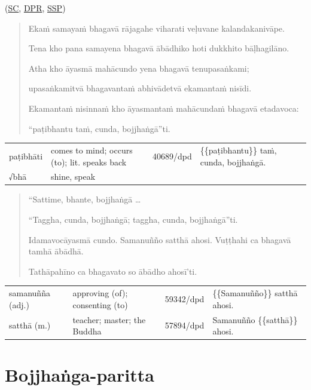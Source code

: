 \documentclass[11pt,oneside]{memoir}
\begin{document}
(\href{https://suttacentral.net/sn46.16/pli/ms}{SC}, \href{https://www.digitalpalireader.online/\_dprhtml/index.html?loc=s.4.0.0.1.1.5.m}{DPR}, \href{http://localhost:4848/suttas/sn46.16/pli/ms?window\_type=Sutta+Study}{SSP})

\begin{quote}
Ekaṁ samayaṁ bhagavā rājagahe viharati veḷuvane kalandakanivāpe.

Tena kho pana samayena bhagavā ābādhiko hoti dukkhito bāḷhagilāno.

Atha kho āyasmā mahācundo yena bhagavā tenupasaṅkami;

upasaṅkamitvā bhagavantaṁ abhivādetvā ekamantaṁ nisīdi.

Ekamantaṁ nisinnaṁ kho āyasmantaṁ mahācundaṁ bhagavā etadavoca:

“paṭibhantu taṁ, cunda, bojjhaṅgā”ti.
\end{quote}

\begin{longtable}{L{\colOne} L{\colTwo} H H}
paṭibhāti & comes to mind; occurs (to); lit. speaks back & 40689/dpd & \{\{paṭibhantu\}\} taṁ, cunda, bojjhaṅgā.\\[0pt]
√bhā & shine, speak &  & \\[0pt]
\end{longtable}

\begin{quote}
“Sattime, bhante, bojjhaṅgā \ldots{}

“Taggha, cunda, bojjhaṅgā; taggha, cunda, bojjhaṅgā”ti.

Idamavocāyasmā cundo. Samanuñño satthā ahosi. Vuṭṭhahi ca bhagavā tamhā ābādhā.

Tathāpahīno ca bhagavato so ābādho ahosī'ti.
\end{quote}

\begin{longtable}{L{\colOne} L{\colTwo} H H}
samanuñña (adj.) & approving (of); consenting (to) & 59342/dpd & \{\{Samanuñño\}\} satthā ahosi.\\[0pt]
satthā (m.) & teacher; master; the Buddha & 57894/dpd & Samanuñño \{\{satthā\}\} ahosi.\\[0pt]
\end{longtable}

\clearpage
\casesLegendHeaderBGHere

\section{Bojjhaṅga-paritta}
\label{sec:org719738f}
\end{document}
